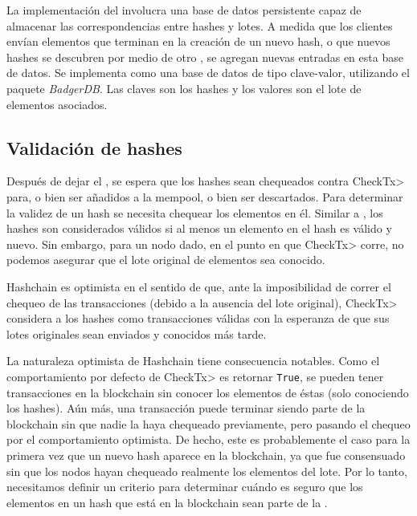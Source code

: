 La implementación del \hcollector involucra una base de datos persistente capaz de almacenar
las correspondencias entre hashes y lotes.
%
%
A medida que los clientes envían elementos que terminan en la creación de un nuevo hash, o que nuevos hashes se descubren
por medio de otro \hcollector, se agregan nuevas entradas en esta base de datos.
%
Se implementa como una base de datos de tipo clave-valor, utilizando el paquete
\textit{BadgerDB}.
%
Las claves son los hashes y los valores son el lote de elementos asociados.

\subsection{Validación de hashes}

Después de dejar el \hcollector, se espera que los hashes sean chequeados contra \<CheckTx>
para, o bien ser añadidos a la mempool, o bien ser descartados.
%
Para determinar la validez de un hash se necesita chequear los elementos en él. Similar a
\compresschain, los hashes son considerados válidos si al menos un elemento
en el hash es válido y nuevo.
%
Sin embargo, para un nodo dado, en el punto en que \<CheckTx> corre, no podemos asegurar que el
lote original de elementos sea conocido.

%
Hashchain es optimista en el sentido de que, ante la imposibilidad de correr el chequeo
de las transacciones (debido a la ausencia del lote original), \<CheckTx> considera a los
hashes como transacciones válidas con la esperanza de que sus lotes originales sean enviados
y conocidos más tarde. 

%
La naturaleza optimista de Hashchain tiene consecuencia notables.
%
Como el comportamiento por defecto de  \<CheckTx> es retornar \texttt{True},
se pueden tener transacciones en la blockchain sin conocer los elementos de éstas
(solo conociendo los hashes).
%
Aún más, una transacción puede terminar siendo parte de la blockchain sin que nadie
la haya chequeado previamente, pero pasando el chequeo por el comportamiento optimista.
%
De hecho, este es probablemente el caso para la primera vez que un nuevo hash aparece
en la blockchain, ya que fue consensuado sin que los nodos hayan chequeado realmente los elementos
del lote.
%
Por lo tanto, necesitamos definir un criterio para determinar cuándo es seguro
que los elementos en un hash que está en la blockchain sean parte de la \setchain.

